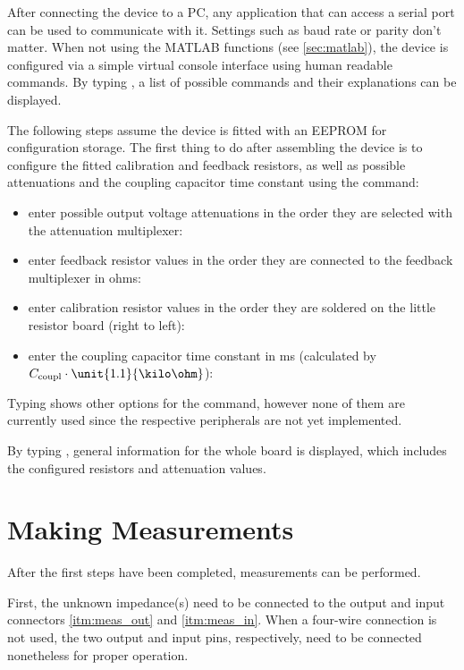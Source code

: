 After connecting the device to a PC, any application that can access a serial port can be used to communicate with it.
Settings such as baud rate or parity don't matter.
When not using the MATLAB functions (see \autoref{sec:matlab}), the device is configured via a simple virtual console
interface using human readable commands. By typing , a list of possible commands and their
explanations can be displayed.

The following steps assume the device is fitted with an EEPROM for configuration storage.
The first thing to do after assembling the device is to configure the fitted calibration and feedback resistors, as well
as possible attenuations and the coupling capacitor time constant using the  command:
\begin{itemize}
	\item enter possible output voltage attenuations in the order they are selected with the attenuation multiplexer:
  \item enter feedback resistor values in the order they are connected to the feedback multiplexer in ohms:
  \item enter calibration resistor values in the order they are soldered on the little resistor board (right to left):
  \item enter the coupling capacitor time constant in ms (calculated by $ C_\text{coupl} \cdot \unit{1.1}{\kilo\ohm} $):
\end{itemize}
Typing  shows other options for the  command, however none of them are currently
used since the respective peripherals are not yet implemented.

By typing , general information for the whole board is displayed, which includes the configured
resistors and attenuation values.


\section{Making Measurements}

After the first steps have been completed, measurements can be performed.

First, the unknown impedance(s) need to be connected to the output and input connectors \ref{itm:meas_out} and
\ref{itm:meas_in}. When a four-wire connection is not used, the two output and input pins, respectively, need to be
connected nonetheless for proper operation.

